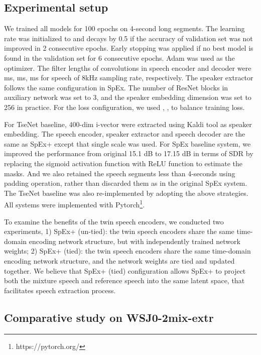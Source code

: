 \documentclass[a4paper]{article}
\begin{document}
\subsection{Experimental setup}

We trained all models for 100 epochs on 4-second long segments. The learning rate was initialized to  and decays by 0.5 if the accuracy of validation set was not improved in 2 consecutive epochs. Early stopping was applied if no best model is found in the validation set for 6 consecutive epochs. Adam was used as the optimizer. 
The filter lengths of convolutions in speech encoder and decoder were ms, ms, ms for speech of 8kHz sampling rate,
respectively. The speaker extractor follows the same configuration in SpEx\cite{spex2020}. The number of ResNet blocks in auxiliary network  was set to 3, and the speaker embedding dimension was set to 256 in practice. For the loss configuration, we used , ,  to balance training loss. 

For TseNet \cite{xu2019time} baseline, 400-dim i-vector were extracted using Kaldi tool as speaker embedding. The speech encoder, speaker extractor and speech decoder are the same as SpEx+ except that single scale was used. For SpEx baseline system, we improved the performance from original 15.1 dB to 17.15 dB in terms of SDR by replacing the sigmoid activation function with ReLU function to estimate the masks. And we also retained the speech segments less than 4-seconds using padding operation, rather than discarded them as in the original SpEx system. The TseNet baseline was also re-implemented by adopting the above strategies. All systems were implemented with Pytorch\footnote{https://pytorch.org/}.

To examine the benefits of the twin speech encoders, we conducted two experiments, 1) SpEx+ (un-tied): the twin speech encoders share the same time-domain encoding network structure, but with independently trained network weights; 2) SpEx+ (tied): the twin speech encoders share the same time-domain encoding network structure, and the network weights are tied and updated together. We believe that SpEx+ (tied) configuration allows SpEx+ to project both the mixture speech and reference speech into the same latent space, that facilitates speech extraction process. 

\subsection{Comparative study on WSJ0-2mix-extr}
\end{document}
